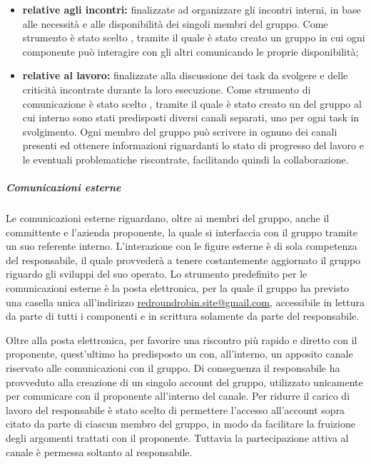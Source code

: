 				\begin{itemize}
					\item \textbf{relative agli incontri:} finalizzate ad organizzare gli incontri interni, in base alle necessità e alle disponibilità dei singoli membri del gruppo.
					\newline
					Come strumento è stato scelto , tramite il quale è stato creato un gruppo in cui ogni componente può interagire con gli altri comunicando le proprie disponibilità;
					\item \textbf{relative al lavoro:} finalizzate alla discussione dei task da svolgere e delle criticità incontrate durante la loro esecuzione.
					\newline
					Come strumento di comunicazione è stato scelto , tramite il quale è stato creato un  del gruppo al cui interno sono stati predisposti diversi canali separati, uno per ogni task in svolgimento. Ogni membro del gruppo può scrivere in ognuno dei canali presenti ed ottenere informazioni riguardanti lo stato di progresso del lavoro e le eventuali problematiche riscontrate, facilitando quindi la collaborazione.
				\end{itemize}

			\subparagraph{Comunicazioni esterne}

				Le comunicazioni esterne riguardano, oltre ai membri del gruppo, anche il committente e l'azienda proponente, la quale si interfaccia con il gruppo tramite un suo referente interno. L'interazione con le figure esterne è di sola competenza del responsabile, il quale provvederà a tenere costantemente aggiornato il gruppo riguardo gli sviluppi del suo operato.
				\newline
				Lo strumento predefinito per le comunicazioni esterne è la posta elettronica, per la quale il gruppo ha previsto una casella unica all'indirizzo \href{mailto:redroundrobin.site@gmail.com}{redroundrobin.site@gmail.com}, accessibile in lettura da parte di tutti i componenti e in scrittura solamente da parte del responsabile.

				Oltre alla posta elettronica, per favorire una riscontro più rapido e diretto con il proponente, quest'ultimo ha predisposto un   con, all'interno, un apposito canale riservato alle comunicazioni con il gruppo. Di conseguenza il responsabile ha provveduto alla creazione di un singolo account  del gruppo, utilizzato unicamente per comunicare con il proponente all'interno del canale. Per ridurre il carico di lavoro del responsabile è stato scelto di permettere l'accesso all'account sopra citato da parte di ciascun membro del gruppo, in modo da facilitare la fruizione degli argomenti trattati con il proponente. Tuttavia la partecipazione attiva al canale è permessa soltanto al responsabile.

